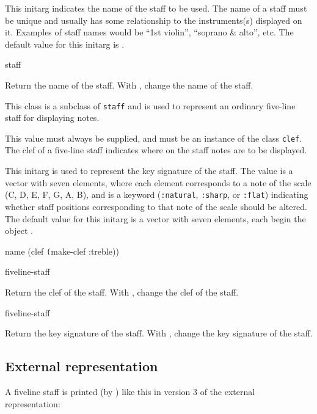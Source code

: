 
This initarg indicates the name of the staff to be used.  The name of
a staff must be unique and usually has some relationship to the
instruments(s) displayed on it.  Examples of staff names would be
``1st violin'', ``soprano & alto'', etc.  The default value for this
initarg is .

 {staff}

Return the name of the staff.  With , change the name of
the staff.


This class is a subclass of \texttt{staff} and is used to represent an
ordinary five-line staff for displaying notes. 


This value must always be supplied, and must be an instance of the
class \texttt{clef}.  The clef of a five-line staff indicates where
on the staff notes are to be displayed.  


This initarg is used to represent the key signature of the staff.  The
value is a vector with seven elements, where each element corresponds
to a note of the scale (C, D, E, F, G, A, B), and is a keyword
(\texttt{:natural}, \texttt{:sharp}, or \texttt{:flat}) indicating
whether staff positions corresponding to that note of the scale should
be altered.  The default value for this initarg is a vector with seven
elements, each begin the object .

 {name \optional (clef \texttt(make-clef :treble))}

 {fiveline-staff}

Return the clef of the staff.  With , change the clef of
the staff.

 {fiveline-staff}

Return the key signature of the staff.  With , change
the key signature of the staff. 

\subsection{External representation}

A fiveline staff is printed (by ) like this in
version 3 of the external representation:

